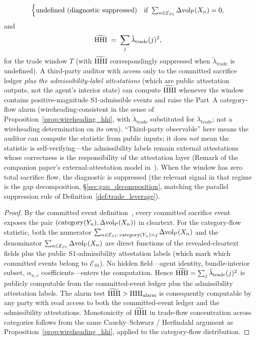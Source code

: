 \begin{proposition}
\[\begin{cases}
    \text{undefined (diagnostic suppressed)}
      & \text{if } \sum_{n \in \mathcal{E}_{S1}}
        \Delta{\operatorname{vol}_{\mathrm{P}}}(X_n) = 0,
  \end{cases}
\]
and
\[
  \widetilde{\mathrm{HHI}} \;=\; \sum_j \tilde\lambda_{\mathrm{trade}}(j)^2,
\]
for the trade window $T$ (with $\widetilde{\mathrm{HHI}}$ correspondingly
suppressed when $\tilde\lambda_{\mathrm{trade}}$ is undefined).
A third-party auditor with access only to the committed
sacrifice ledger \emph{plus the admissibility-label
attestations} (which are public attestation outputs, not the
agent's interior state) can compute $\widetilde{\mathrm{HHI}}$ whenever
the window contains positive-magnitude S1-admissible events
and raise the Part~A category-flow alarm
(wireheading-consistent in the sense of
Proposition~\ref{prop:wireheading_hhi}, with
$\tilde\lambda_{\mathrm{trade}}$ substituted for
$\lambda_{\mathrm{trade}}$; not a wireheading determination on
its own).  ``Third-party observable'' here means the auditor
can compute the statistic from public inputs; it does
\emph{not} mean the statistic is self-verifying---the
admissibility labels remain external attestations whose
correctness is the responsibility of the attestation layer
(Remark of the companion paper's external-attestation model
in~\citep[Revealed~Sacrifice]{lasser2026paper8a}).  When the window has zero total sacrifice flow, the
diagnostic is suppressed (the relevant signal in that regime is
the gap decomposition, \S\ref{sec:gap_decomposition}, matching
the parallel suppression rule of
Definition~\ref{def:trade_leverage}).
\end{proposition}

\begin{proof}
By the committed event definition~\citep[Revealed~Sacrifice]{lasser2026paper8a}, every committed
sacrifice event exposes the pair $(\mathrm{category}(Y_{n}), \Delta{\operatorname{vol}_{\mathrm{P}}}(X_n))$
in cleartext.  For the category-flow statistic, both the
numerator $\sum_{n \in \mathcal{E}_{S1} :\, \mathrm{category}(Y_{n}) = j}
\Delta{\operatorname{vol}_{\mathrm{P}}}(X_n)$ and the denominator $\sum_{n \in
\mathcal{E}_{S1}} \Delta{\operatorname{vol}_{\mathrm{P}}}(X_n)$ are direct functions of
the revealed-cleartext fields plus the public S1-admissibility
attestation labels (which mark which committed events belong
to $\mathcal{E}_{S1}$).  No hidden
field---agent identity, bundle-interior subset, $\alpha_{n,c}$
coefficients---enters the computation.  Hence
$\widetilde{\mathrm{HHI}} = \sum_j \tilde\lambda_{\mathrm{trade}}(j)^2$ is
publicly computable from the committed-event ledger plus the
admissibility attestation labels.  The alarm test
$\widetilde{\mathrm{HHI}} > \mathrm{HHI}_{\mathrm{alarm}}$ is consequently
computable by any party with read access to both the
committed-event ledger and the admissibility attestations.  Monotonicity of $\widetilde{\mathrm{HHI}}$ in trade-flow
concentration across categories follows from the same
Cauchy--Schwarz / Herfindahl argument as
Proposition~\ref{prop:wireheading_hhi}, applied to the
category-flow distribution.
\end{proof}

